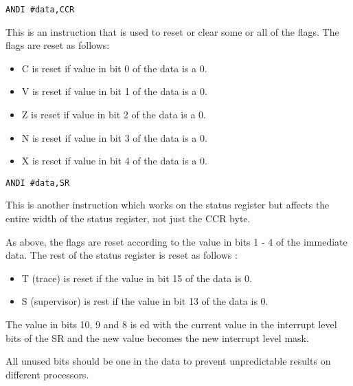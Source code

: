 \begin{lstlisting}[firstnumber=1,]
          ANDI #data,CCR 
\end{lstlisting}

This is an instruction that is used to reset or clear some or all of
    the flags. The flags are reset as follows:
\begin{itemize}[itemsep=0pt]

\item{}C is reset if value in bit 0 of the data is a 0.


\item{}V is reset if value in bit 1 of the data is a 0.


\item{}Z is reset if value in bit 2 of the data is a 0.


\item{}N is reset if value in bit 3 of the data is a 0.


\item{}X is reset if value in bit 4 of the data is a 0.

\end{itemize}

\begin{lstlisting}[firstnumber=1,]
          ANDI #data,SR
\end{lstlisting}

This is another instruction which works on the status register but
    affects the entire width of the status register, not just the CCR
    byte.

As above, the flags are reset according to the value in bits 1 -{} 4
    of the immediate data. The rest of the status register is reset as follows
   :
\begin{itemize}[itemsep=0pt]

\item{}T (trace) is reset if the value in bit 15 of the data is
        0.


\item{}S (supervisor) is rest if the value in bit 13 of the data is
        0.

\end{itemize}

The value in bits 10, 9 and 8 is ed with the current value in the
    interrupt level bits of the SR and the new value becomes the new interrupt
    level mask.

All unused bits should be one in the data to prevent unpredictable
    results on different processors.


